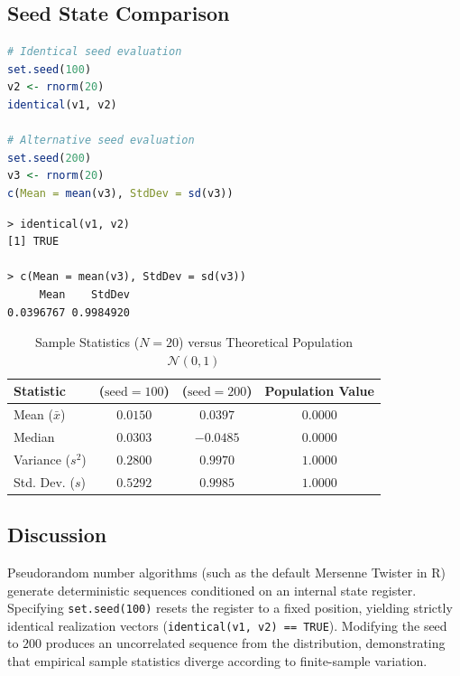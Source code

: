 \documentclass[11pt, a4paper]{article}
\begin{document}
\subsection{Seed State Comparison}
\begin{lstlisting}[language=R]
# Identical seed evaluation
set.seed(100)
v2 <- rnorm(20)
identical(v1, v2)

# Alternative seed evaluation
set.seed(200)
v3 <- rnorm(20)
c(Mean = mean(v3), StdDev = sd(v3))
\end{lstlisting}

\begin{lstlisting}
> identical(v1, v2)
[1] TRUE

> c(Mean = mean(v3), StdDev = sd(v3))
     Mean    StdDev 
0.0396767 0.9984920 
\end{lstlisting}

\begin{table}[htbp]
  \centering
  \caption{Sample Statistics ($N=20$) versus Theoretical Population $\mathcal{N}(0, 1)$}
  \label{tab:seed_stats}
  \vspace{0.4em}
  \begin{tabular}{lccc}
    \toprule
    \textbf{Statistic} & \textbf{($\text{seed}=100$)} & \textbf{($\text{seed}=200$)} & \textbf{Population Value} \\
    \midrule
    Mean ($\bar{x}$)   & $0.0150$                     & $0.0397$                     & $0.0000$                  \\
    Median             & $0.0303$                     & $-0.0485$                    & $0.0000$                  \\
    Variance ($s^2$)   & $0.2800$                     & $0.9970$                     & $1.0000$                  \\
    Std. Dev. ($s$)    & $0.5292$                     & $0.9985$                     & $1.0000$                  \\
    \bottomrule
  \end{tabular}
\end{table}

\subsection{Discussion}
Pseudorandom number algorithms (such as the default Mersenne Twister in R) generate deterministic sequences conditioned on an internal state register. Specifying \texttt{set.seed(100)} resets the register to a fixed position, yielding strictly identical realization vectors (\texttt{identical(v1, v2) == TRUE}). Modifying the seed to $200$ produces an uncorrelated sequence from the distribution, demonstrating that empirical sample statistics diverge according to finite-sample variation.
\end{document}
